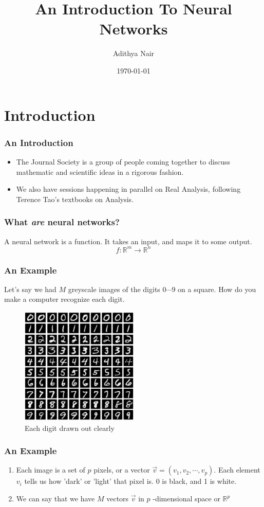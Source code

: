 \message{ !name(slides.tex)}\documentclass{beamer}
\title{An Introduction To Neural Networks}
\author{Adithya Nair}
\institute{The Journal Society, Amrita Vishwa Vidyapeetham}
\date{\today}
\begin{document}

\begin{frame}
\titlepage
\end{frame}
\section{Introduction}
\begin{frame}
  \frametitle{An Introduction}
  \begin{itemize}
  \item The Journal Society is a group of people coming together to discuss mathematic and scientific ideas in a rigorous fashion.
    \item  We also have sessions happening in parallel on Real Analysis, following Terence Tao's textbooks on Analysis.
  \end{itemize}
\end{frame}

\begin{frame}
  \frametitle{What \textit{are} neural networks?}
  A neural network is a function. It takes an input, and maps it to some output.
  \[f : \mathbb{R}^m \rightarrow \mathbb{R}^n\]
\end{frame}
\begin{frame}
  \frametitle{An Example}

  Let's say we had $M$ greyscale images of the digits $0 \cdots 9$ on a square. How do you make a computer recognize each digit.

\begin{figure}[ht]
  \centering
  \includegraphics[width=0.5\textwidth]{figures/dataset-card.png}
  \caption{Each digit drawn out clearly}
\end{figure}

\end{frame}
\begin{frame}
  \frametitle{An  Example}
  \begin{enumerate}
\item Each image is a set of \(p\) pixels, or a vector \(\vec{v} = (v_1, v_2, \cdots , v_p)\). Each element \(v_i\) tells us how 'dark' or 'light' that pixel is. 0 is black, and 1 is white.
          \pause
          \item We can say that we have \(M\) vectors \(\vec{v}\) in \(p\) -dimensional space or \(\mathbb{R}^{p}\)
  \end{enumerate}

\end{frame}
\end{document}
